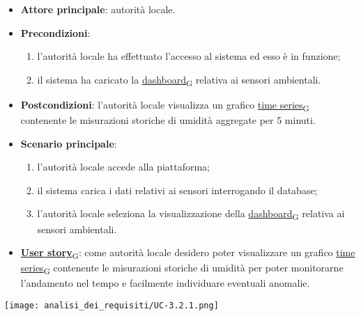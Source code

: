 \newpage
{}
\begin{itemize}
	\item \textbf{Attore principale}: autorità locale.
	\item \textbf{Precondizioni}:
	      \begin{enumerate}
		      \item l'autorità locale ha effettuato l'accesso al sistema ed esso è in funzione;
		      \item il sistema ha caricato la \href{https://7last.github.io/docs/pb/documentazione-interna/glossario\#dashboard}{dashboard\textsubscript{G}} relativa ai sensori ambientali.
	      \end{enumerate}
	\item \textbf{Postcondizioni}: l'autorità locale visualizza un grafico \href{https://7last.github.io/docs/pb/documentazione-interna/glossario\#time-series}{time series\textsubscript{G}} contenente le misurazioni storiche di umidità aggregate per 5 minuti.
	\item \textbf{Scenario principale}:
	      \begin{enumerate}
		      \item l'autorità locale accede alla piattaforma;
		      \item il sistema carica i dati relativi ai sensori interrogando il database;
		      \item l'autorità locale seleziona la visualizzazione della \href{https://7last.github.io/docs/pb/documentazione-interna/glossario\#dashboard}{dashboard\textsubscript{G}} relativa ai sensori ambientali.
	      \end{enumerate}
	\item \href{https://7last.github.io/docs/pb/documentazione-interna/glossario\#user-story}{\textbf{User story}\textsubscript{G}}:
	      come autorità locale desidero poter visualizzare un grafico \href{https://7last.github.io/docs/pb/documentazione-interna/glossario\#time-series}{time series\textsubscript{G}} contenente le misurazioni storiche
	      di umidità per poter monitorarne l'andamento nel tempo e facilmente individuare eventuali anomalie.
\end{itemize}
\begin{center}
	\texttt{[image: analisi\_dei\_requisiti/UC-3.2.1.png]}
\end{center}

